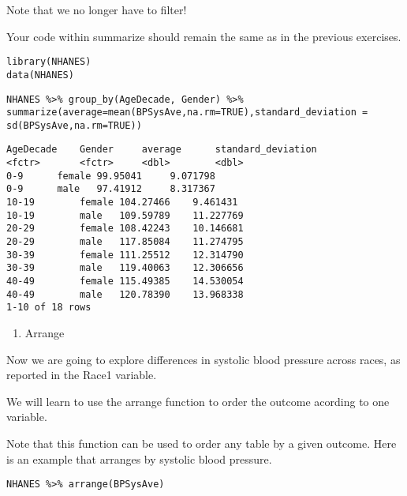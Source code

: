 \documentclass[]{article}
\providecommand{\tightlist}{%
  \setlength{\itemsep}{0pt}\setlength{\parskip}{0pt}}
\begin{document}
Note that we no longer have to filter!

Your code within summarize should remain the same as in the previous
exercises.

\begin{verbatim}
library(NHANES)
data(NHANES)
\end{verbatim}

\begin{verbatim}
NHANES %>% group_by(AgeDecade, Gender) %>% summarize(average=mean(BPSysAve,na.rm=TRUE),standard_deviation = sd(BPSysAve,na.rm=TRUE))
\end{verbatim}

\begin{verbatim}
AgeDecade    Gender     average      standard_deviation
<fctr>       <fctr>     <dbl>        <dbl>
0-9      female 99.95041     9.071798
0-9      male   97.41912     8.317367
10-19        female 104.27466    9.461431
10-19        male   109.59789    11.227769
20-29        female 108.42243    10.146681
20-29        male   117.85084    11.274795
30-39        female 111.25512    12.314790
30-39        male   119.40063    12.306656
40-49        female 115.49385    14.530054
40-49        male   120.78390    13.968338
1-10 of 18 rows
\end{verbatim}

\begin{enumerate}
\def\labelenumi{\arabic{enumi}.}
\setcounter{enumi}{7}
\tightlist
\item
  Arrange
\end{enumerate}

Now we are going to explore differences in systolic blood pressure
across races, as reported in the Race1 variable.

We will learn to use the arrange function to order the outcome acording
to one variable.

Note that this function can be used to order any table by a given
outcome. Here is an example that arranges by systolic blood pressure.

\begin{verbatim}
NHANES %>% arrange(BPSysAve)
\end{verbatim}
\end{document}
